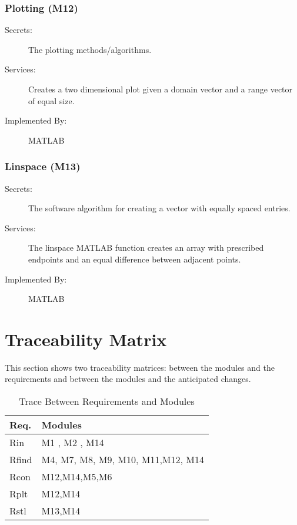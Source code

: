 \documentclass[12pt, titlepage]{article}
\begin{document}
\subsubsection{Plotting (M12)} 

\begin{description}
	\item[Secrets:] The plotting methods/algorithms.
	\item[Services:] Creates a two dimensional plot given a domain vector and a 
	range vector of equal size.  
	\item[Implemented By:] MATLAB
\end{description} 

\subsubsection{Linspace (M13)} 

\begin{description}
	\item[Secrets:] The software algorithm for creating a vector with equally 
	spaced entries. 
	\item[Services:] The linspace MATLAB function creates an array with 
	prescribed 
	endpoints and an equal difference between adjacent points.
	\item[Implemented By:] MATLAB
\end{description} 

\section{Traceability Matrix} \label{SecTM}

This section shows two traceability matrices: between the modules and the
requirements and between the modules and the anticipated changes.

\begin{table}[H]
\centering
\begin{tabular}{p{} p{}}
\toprule
\textbf{Req.} & \textbf{Modules}\\
\midrule
Rin & M1 , M2 , M14\\
Rfind & M4, M7, M8, M9, M10, M11,M12, M14\\
Rcon & M12,M14,M5,M6\\
Rplt & M12,M14 \\
Rstl & M13,M14\\
\bottomrule
\end{tabular}
\caption{Trace Between Requirements and Modules}
\label{TblRT}
\end{table}
\end{document}
